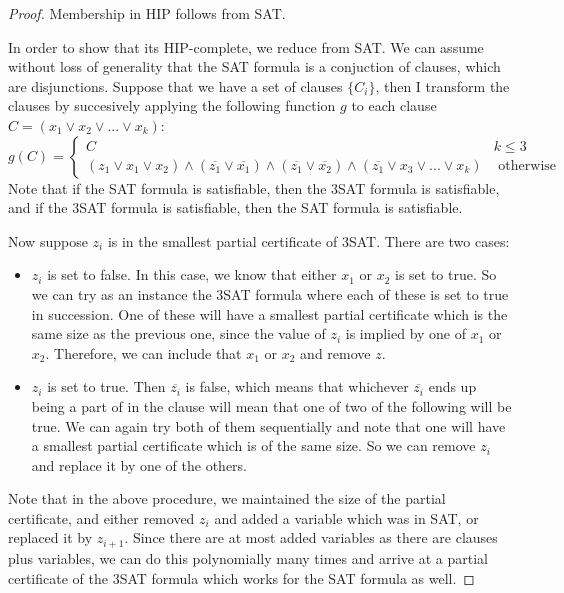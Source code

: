 \documentclass[runningheads,a4paper]{llncs}
\begin{document}
\begin{proof}
Membership in HIP follows from SAT. 

In order to show that its HIP-complete, we reduce from SAT. We can assume without loss of generality that the SAT formula is a conjuction of clauses, which are disjunctions. Suppose that we have a set of clauses $\{ C_i \}$, then I transform the clauses by succesively applying the following function $g$ to each clause $C = (x_1 \vee x_2 \vee ... \vee x_k)$:
\[ g(C) = \left\{ \begin{array}{cc} C & k \leq 3 \\
						    (z_1 \vee x_1 \vee x_2) \wedge (\overline{z_1} \vee \overline{x_1}) \wedge (\overline{z_1} \vee \overline{x_2}) \wedge (\overline{z_1} \vee x_3 \vee ... \vee x_k) & \text{ otherwise }\end{array} \right. \] 
Note that if the SAT formula is satisfiable, then the 3SAT formula is satisfiable, and if the 3SAT formula is satisfiable, then the SAT formula is satisfiable. 

Now suppose $z_i$ is in the smallest partial certificate of 3SAT. There are two cases:
\begin{itemize}
\item $z_i$ is set to false. In this case, we know that either $x_1$ or $x_2$ is set to true. So we can try as an instance the 3SAT formula where each of these is set to true in succession. One of these will have a smallest partial certificate which is the same size as the previous one, since the value of $z_i$ is implied by one of $x_1$ or $x_2$. Therefore, we can include that $x_1$ or $x_2$ and remove $z$.
\item $z_i$ is set to true. Then $\overline{z_i}$ is false, which means that whichever $\overline{z_i}$ ends up being a part of in the clause will mean that one of two of the following will be true. We can again try both of them sequentially and note that one will have a smallest partial certificate which is of the same size. So we can remove $z_i$ and replace it by one of the others. 
\end{itemize}
Note that in the above procedure, we maintained the size of the partial certificate, and either removed $z_i$ and added a variable which was in SAT, or replaced it by $z_{i+1}$. Since there are at most added variables as there are clauses plus variables, we can do this polynomially many times and arrive at a partial certificate of the 3SAT formula which works for the SAT formula as well.
\end{proof}



\end{document}
